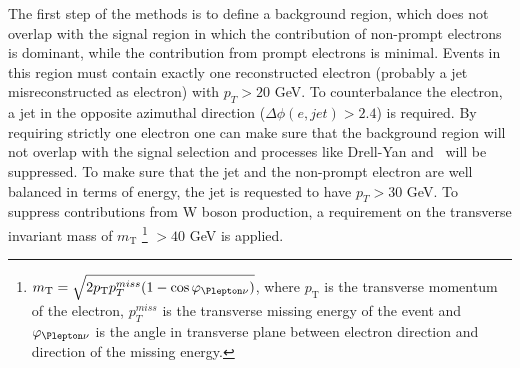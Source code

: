 The first step of the methods is to define a background region, which does not overlap with the signal region in which the
contribution of non-prompt electrons is dominant, while the contribution from prompt electrons is minimal.
Events in this region must contain exactly one reconstructed electron (probably a jet misreconstructed as electron) with $p_T > 20$ GeV.
To counterbalance the electron, a jet in the opposite azimuthal direction ($\Delta \phi (e,jet) > 2.4$) is required.
By requiring strictly one electron one can make sure that the background region will not overlap with the signal selection and processes 
like Drell-Yan and \ttbar~will be suppressed.
To make sure that the jet and the non-prompt electron are well balanced in terms of energy, the jet is
requested to have $p_T > 30$ GeV.
To suppress contributions from W boson production, a requirement on the transverse invariant mass of 
$m_\mathrm{T}$
\footnote{$m_\mathrm{T} = \sqrt{2 p_\mathrm{T} p_T^{miss} (1-\cos\varphi_{\Plepton\nu})}$, where
$p_\mathrm{T}$ is the transverse momentum of the electron, $p_T^{miss}$ is the transverse missing energy of the event
and $\varphi_{\Plepton\nu}$ is the angle in transverse plane between electron direction and direction of the missing energy.}
$ > 40$ GeV is applied.

